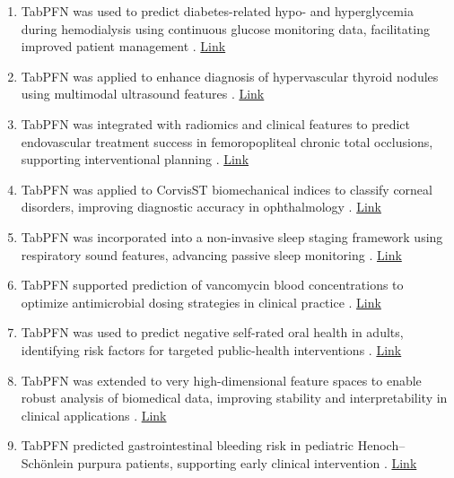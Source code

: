 \begin{enumerate}
\item TabPFN was used to predict diabetes-related hypo- and hyperglycemia during hemodialysis using continuous glucose monitoring data, facilitating improved patient management \cite{hc_usecase40}. \href{https://www.medrxiv.org/content/10.1101/2025.10.24.25338707v1}{Link}

\item TabPFN was applied to enhance diagnosis of hypervascular thyroid nodules using multimodal ultrasound features \cite{hc_usecase52_thyroid_hypervascular_multimodal}. \href{https://pmc.ncbi.nlm.nih.gov/articles/PMC12432950/}{Link}

\item TabPFN was integrated with radiomics and clinical features to predict endovascular treatment success in femoropopliteal chronic total occlusions, supporting interventional planning \cite{hc_usecase53_fp_cto_radiomics}. \href{https://www.researchgate.net/publication/396892115_Radiomics_enhance_the_prediction_of_endovascular_treatment_success_for_femoropopliteal_chronic_total_occlusions_a_proof-of-concept_study}{Link}

\item TabPFN was applied to CorvisST biomechanical indices to classify corneal disorders, improving diagnostic accuracy in ophthalmology \cite{hc_usecase41_corvisst_corneal}. \href{https://pubmed.ncbi.nlm.nih.gov/41130662/}{Link}

\item TabPFN was incorporated into a non-invasive sleep staging framework using respiratory sound features, advancing passive sleep monitoring \cite{hc_usecase42_sleepstage_resp_sounds}. \href{https://www.mdpi.com/1424-8220/25/20/6282}{Link}

\item TabPFN supported prediction of vancomycin blood concentrations to optimize antimicrobial dosing strategies in clinical practice \cite{hc_usecase43_vancomycin_mimic4}. \href{https://journal.china-pharmacy.com/en/article/doi/10.6039/j.issn.1001-0408.2025.19.16/}{Link} 

\item TabPFN was used to predict negative self-rated oral health in adults, identifying risk factors for targeted public-health interventions \cite{hc_usecase44_sroh_jdent}. \href{https://www.sciencedirect.com/science/article/pii/S0300571225006104}{Link} 

\item TabPFN was extended to very high-dimensional feature spaces to enable robust analysis of biomedical data, improving stability and interpretability in clinical applications \cite{hc_usecase45_tabpfn_wide}. \href{https://arxiv.org/abs/2510.06162}{Link}

\item TabPFN predicted gastrointestinal bleeding risk in pediatric Henoch–Schönlein purpura patients, supporting early clinical intervention \cite{hc_usecase50_gibleed_hsp}. \href{https://www.frontiersin.org/journals/physiology/articles/10.3389/fphys.2025.1630807/full}{Link}

\end{enumerate}

